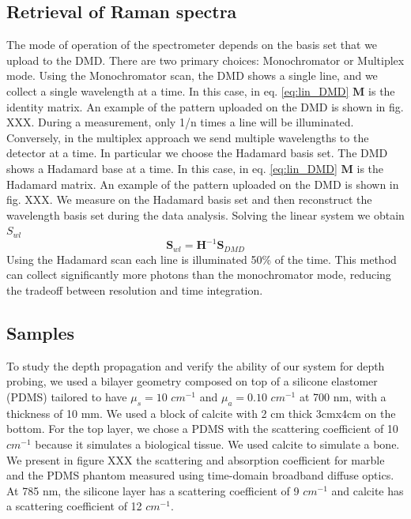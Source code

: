\documentclass{osa-article}
\begin{document}
\subsection{Retrieval of Raman spectra}
The mode of operation of the spectrometer depends on the basis set that we upload to the DMD. There are two primary choices: Monochromator or Multiplex mode.
Using the Monochromator scan, the DMD shows a single line, and we collect a single wavelength at a time. In this case, in eq. \ref{eq:lin_DMD} $\textbf{M}$ is the identity matrix. An example of the pattern uploaded on the DMD is shown in fig. XXX. During a measurement, only 1/n times a line will be illuminated. Conversely, in the multiplex approach we send multiple wavelengths to the detector at a time. In particular we choose the Hadamard basis set. The DMD shows a Hadamard base at a time. In this case, in eq. \ref{eq:lin_DMD} $\textbf{M}$ is the Hadamard matrix. An example of the pattern uploaded on the DMD is shown in fig. XXX. We measure on the Hadamard basis set and then reconstruct the wavelength basis set during the data analysis. 
Solving the linear system we obtain $S_{wl}$
\begin{equation}
    \textbf{S}_{wl} = \textbf{H}^{-1} \textbf{S}_{DMD}
\end{equation}
Using the Hadamard scan each line is illuminated 50\% of the time.
This method can collect significantly more photons than the monochromator mode, reducing the tradeoff between resolution and time integration.

\subsection{Samples}
To study the depth propagation and verify the ability of our system for depth probing, we used a bilayer geometry composed on top of a silicone elastomer (PDMS) tailored to have $\mu_s = 10$ $cm^{-1}$ and $\mu_a = 0.10$ $cm^{-1}$  at 700 nm, with a thickness of 10 mm. We used a block of calcite with 2 cm thick 3cmx4cm on the bottom.
For the top layer, we chose a PDMS with the scattering coefficient of 10 $cm^{-1}$ because it simulates a biological tissue. We used calcite to simulate a bone.
We present in figure XXX the scattering and absorption coefficient for marble and the PDMS phantom measured using time-domain broadband diffuse optics. At 785 nm, the silicone layer has a scattering coefficient of 9 $cm^{-1}$ and calcite has a scattering coefficient of 12 $cm^{-1}$.
\end{document}
